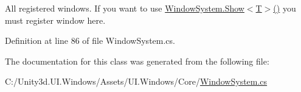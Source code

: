 All registered windows. If you want to use \hyperlink{class_unity_engine_1_1_u_i_1_1_windows_1_1_window_system_a13b9f3a4c5884c3a2b306e018e0cd457}{Window\+System.\+Show$<$\+T$>$()} you must register window here. 



Definition at line 86 of file Window\+System.\+cs.



The documentation for this class was generated from the following file\+:\begin{DoxyCompactItemize}
\item 
C\+:/\+Unity3d.\+U\+I.\+Windows/\+Assets/\+U\+I.\+Windows/\+Core/\hyperlink{_window_system_8cs}{Window\+System.\+cs}\end{DoxyCompactItemize}
